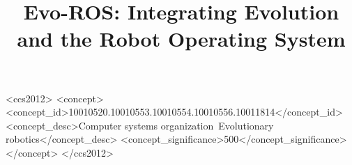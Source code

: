 \documentclass[sigconf]{acmart}
\begin{document}
\title{Evo-ROS: Integrating Evolution and the Robot Operating System}

% 


%
%
\begin{CCSXML}
<ccs2012>
<concept>
<concept_id>10010520.10010553.10010554.10010556.10011814</concept_id>
<concept_desc>Computer systems organization~Evolutionary robotics</concept_desc>
<concept_significance>500</concept_significance>
</concept>
</ccs2012>
\end{CCSXML}




\maketitle










\end{document}
